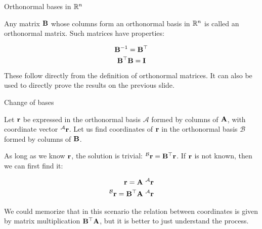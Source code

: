 \documentclass{beamer}
\begin{document}
\begin{frame}{Orthonormal bases in $\mathbb{R}^n$}
	\begin{flushleft}
		
		Any matrix $\mathbf{B}$ whose columns form an orthonormal basis in $\mathbb{R}^n$ is called an orthonormal matrix. Such matrices have properties:
		
		\begin{equation}
			\mathbf{B}^{-1} = \mathbf{B}^\top
		\end{equation}
		\begin{equation}
			\mathbf{B}^\top\mathbf{B} = \mathbf{I}
		\end{equation}		
	
		These follow directly from the definition of orthonormal matrices. It can also be used to directly prove the results on the previous slide.
		
	\end{flushleft}
\end{frame}





\begin{frame}{Change of bases}
	\begin{flushleft}
		
		Let $\mathbf{r}$ be expressed in the orthonormal basis $\mathcal{A}$ formed by columns of $\mathbf{A}$, with coordinate vector $^\mathcal{A}\mathbf{r}$. Let us find coordinates of $\mathbf{r}$ in  the orthonormal basis $\mathcal{B}$ formed by columns of $\mathbf{B}$.
		
		\bigskip
		
		As long as we know $\mathbf{r}$, the solution is trivial: $^\mathcal{B}\mathbf{r} = \mathbf{B}^\top \mathbf{r}$. If $\mathbf{r}$ is not known, then we can first find it:
		
		\begin{align}
			\mathbf{r} = \mathbf{A} \ ^\mathcal{A}\mathbf{r} \\
			^\mathcal{B}\mathbf{r} = \mathbf{B}^\top \mathbf{A} \ ^\mathcal{A}\mathbf{r}
		\end{align}
		
		We could memorize that in this scenario the relation between coordinates is given by matrix multiplication $ \mathbf{B}^\top \mathbf{A}$, but it is better to just understand the process.
		
	\end{flushleft}
\end{frame}
\end{document}
